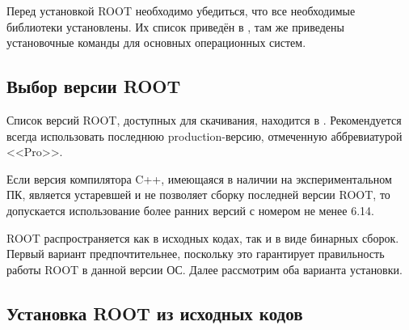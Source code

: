\documentclass[12pt, a4paper, oneside, onecolumn]{book}
\newcommand{\ROOT}{\mbox{ROOT}}
\begin{document}
Перед установкой \ROOT{} необходимо убедиться, что все необходимые библиотеки установлены. Их  список приведён в \cite{RootPrerequisites}, там же приведены установочные команды для основных операционных систем.

\subsection{Выбор версии \ROOT{}}

Список версий \ROOT{}, доступных для скачивания, находится в \cite{RootDownload}. Рекомендуется всегда использовать последнюю  production-версию, отмеченную аббревиатурой <<Pro>>.

Если версия компилятора C++, имеющаяся в наличии на экспериментальном ПК, является устаревшей и не позволяет сборку последней версии \ROOT{}, то допускается использование более ранних версий с номером не менее 6.14.

\ROOT{} распространяется как в исходных кодах, так и в виде бинарных сборок. Первый вариант предпочтительнее, поскольку это гарантирует правильность работы \ROOT{} в данной версии ОС. Далее рассмотрим оба варианта установки.

\subsection{Установка \ROOT{} из исходных кодов}
\label{sec-build-root-from-src}
\end{document}
